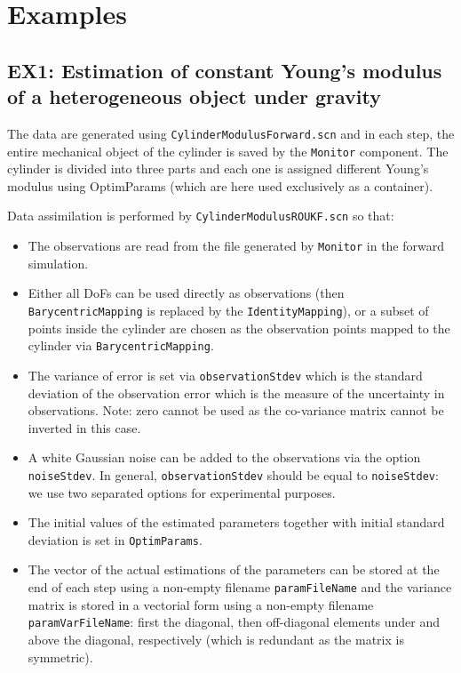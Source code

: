 \documentclass[10pt]{article}
\begin{document}
\section{Examples}

\subsection{EX1: Estimation of constant Young's modulus of a heterogeneous object under gravity}

The data are generated using \texttt{CylinderModulusForward.scn} and in each step, the entire mechanical object of the cylinder is saved by the
\texttt{Monitor} component.
The cylinder is divided into three parts and each one is assigned different Young's modulus using OptimParams  (which are here used exclusively as a
container).

Data assimilation is performed by \texttt{CylinderModulusROUKF.scn} so that:
\begin{itemize}
 \item The observations are read from the file generated by \texttt{Monitor} in the forward simulation. 
 \item Either all DoFs can be used directly as observations (then \texttt{BarycentricMapping} is replaced by the \texttt{IdentityMapping}), or 
 a subset of points inside the cylinder are chosen as the observation points mapped to the cylinder via \texttt{BarycentricMapping}.
 \item The variance of error is set via \texttt{observationStdev} which is the standard deviation of the observation error which is the measure of the
uncertainty in observations. Note: zero cannot be used as the co-variance matrix cannot be inverted in this case.
 \item A white Gaussian noise can be added to the observations via the option \texttt{noiseStdev}. In general, \texttt{observationStdev} should be
equal to \texttt{noiseStdev}: we use two separated options for experimental purposes.
 \item The initial values of the estimated parameters together with initial standard deviation is set in \texttt{OptimParams}.
 \item The vector of the actual estimations of the parameters can be stored at the end of each step using a non-empty filename \texttt{paramFileName}
and the variance matrix is stored in a vectorial 
 form using a non-empty filename \texttt{paramVarFileName}: first the diagonal, then off-diagonal elements under and above the diagonal, respectively
(which is redundant as the matrix is symmetric). 
 \end{itemize}
 
\end{document}
